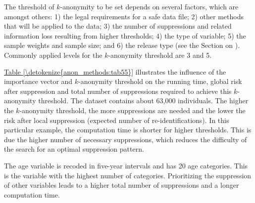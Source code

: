 \documentclass[letterpaper,10pt,english]{sphinxmanual}
\begin{document}
The threshold of \(k\)-anonymity to be set depends on several
factors, which are amongst others: 1) the legal requirements for a safe
data file; 2) other methods that will be applied to the data; 3) the
number of suppressions and related information loss resulting from
higher thresholds; 4) the type of variable; 5) the sample weights and
sample size; and 6) the release type (see the Section on  ).
Commonly applied levels for the \(k\)-anonymity threshold are 3 and 5.

\hyperref[\detokenize{anon_methods:tab55}]{Table \ref{\detokenize{anon_methods:tab55}}} illustrates the influence of the importance vector and
\(k\)-anonymity threshold on the running time, global risk after
suppression and total number of suppressions required to achieve this
\(k\)-anonymity threshold. The dataset contains about 63,000
individuals. The higher the \(k\)-anonymity threshold, the more
suppressions are needed and the lower the risk after local suppression
(expected number of re-identifications). In this particular example, the
computation time is shorter for higher thresholds. This is due the
higher number of necessary suppressions, which reduces the difficulty of
the search for an optimal suppression pattern.

The age variable is recoded in five-year intervals and has 20 age
categories. This is the variable with the highest number of categories.
Prioritizing the suppression of other variables leads to a higher total
number of suppressions and a longer computation time.
\end{document}
